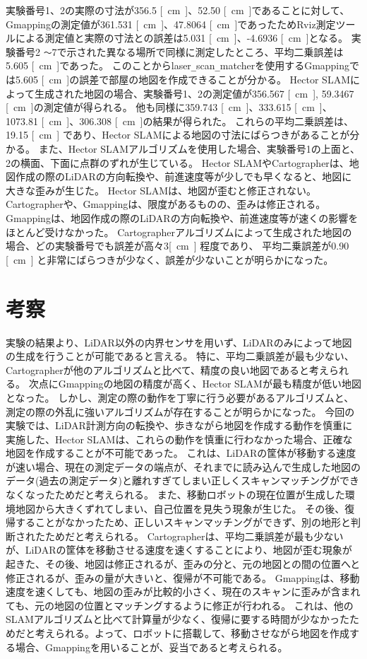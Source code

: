 \clearpage

実験番号1、2の実際の寸法が356.5 \si{[cm]}、52.50 \si{[cm]}であることに対して、Gmappingの測定値が361.531 \si{[cm]}、47.8064 \si{[cm]}であったためRviz測定ツールによる測定値と実際の寸法との誤差は5.031 \si{[cm]}、-4.6936 \si{[cm]}となる。
実験番号2 \verb|～|7で示された異なる場所で同様に測定したところ、平均二乗誤差は5.605 \si{[cm]}であった。
このことからlaser\verb|_|scan\verb|_|matcherを使用するGmappingでは5.605 \si{[cm]}の誤差で部屋の地図を作成できることが分かる。
Hector SLAMによって生成された地図の場合、実験番号1、2の測定値が356.567 \si{[cm]}, 59.3467 \si{[cm]}の測定値が得られる。
他も同様に359.743 \si{[cm]}、333.615 \si{[cm]}、1073.81 \si{[cm]}、306.308 \si{[cm]}の結果が得られた。
これらの平均二乗誤差は、19.15 \si{[cm]} であり、Hector SLAMによる地図の寸法にばらつきがあることが分かる。
また、Hector SLAMアルゴリズムを使用した場合、実験番号1の上面と、2の横面、下面に点群のずれが生じている。
Hector SLAMやCartographerは、地図作成の際のLiDARの方向転換や、前進速度等が少しでも早くなると、地図に大きな歪みが生じた。
Hector SLAMは、地図が歪むと修正されない。Cartographerや、Gmappingは、限度があるものの、歪みは修正される。
Gmappingは、地図作成の際のLiDARの方向転換や、前進速度等が速くの影響をほとんど受けなかった。
Cartographerアルゴリズムによって生成された地図の場合、どの実験番号でも誤差が高々3\si{[cm]} 程度であり、
平均二乗誤差が0.90 \si{[cm]} と非常にばらつきが少なく、誤差が少ないことが明らかになった。

\section{考察}
実験の結果より、LiDAR以外の内界センサを用いず、LiDARのみによって地図の生成を行うことが可能であると言える。
特に、平均二乗誤差が最も少ない、Cartographerが他のアルゴリズムと比べて、精度の良い地図であると考えられる。
次点にGmappingの地図の精度が高く、Hector SLAMが最も精度が低い地図となった。
しかし、測定の際の動作を丁寧に行う必要があるアルゴリズムと、測定の際の外乱に強いアルゴリズムが存在することが明らかになった。
今回の実験では、LiDAR計測方向の転換や、歩きながら地図を作成する動作を慎重に実施した、Hector SLAMは、これらの動作を慎重に行わなかった場合、正確な地図を作成することが不可能であった。
これは、LiDARの筐体が移動する速度が速い場合、現在の測定データの端点が、それまでに読み込んで生成した地図のデータ(過去の測定データ)と離れすぎてしまい正しくスキャンマッチングができなくなったためだと考えられる。
また、移動ロボットの現在位置が生成した環境地図から大きくずれてしまい、自己位置を見失う現象が生じた。
その後、復帰することがなかったため、正しいスキャンマッチングができず、別の地形と判断されたためだと考えられる。
Cartographerは、平均二乗誤差が最も少ないが、LiDARの筐体を移動させる速度を速くすることにより、地図が歪む現象が起きた、その後、地図は修正されるが、歪みの分と、元の地図との間の位置へと修正されるが、歪みの量が大きいと、復帰が不可能である。
Gmappingは、移動速度を速くしても、地図の歪みが比較的小さく、現在のスキャンに歪みが含まれても、元の地図の位置とマッチングするように修正が行われる。
これは、他のSLAMアルゴリズムと比べて計算量が少なく、復帰に要する時間が少なかったためだと考えられる。よって、ロボットに搭載して、移動させながら地図を作成する場合、Gmappingを用いることが、妥当であると考えられる。

